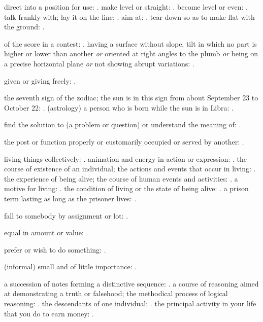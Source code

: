   direct into a position for use: . make level or straight: . become level or even: . talk frankly with; lay it on the line: . aim at: . tear down so as to make flat with the ground: .

  of the score in a contest: . having a surface without slope, tilt in which no part is higher or lower than another \textit{or} oriented at right angles to the plumb \textit{or} being on a precise horizontal plane \textit{or} not showing abrupt variations: .

  given or giving freely: .

  the seventh sign of the zodiac; the sun is in this sign from about September 23 to October 22: . (astrology) a person who is born while the sun is in Libra: .

  find the solution to (a problem or question) or understand the meaning of: .

  the post or function properly or customarily occupied or served by another: .

  living things collectively: . animation and energy in action or expression: . the course of existence of an individual; the actions and events that occur in living: . the experience of being alive; the course of human events and activities: . a motive for living: . the condition of living or the state of being alive: . a prison term lasting as long as the prisoner lives: .

  fall to somebody by assignment or lot: .

  equal in amount or value: .

  prefer or wish to do something: .

  (informal) small and of little importance: .

  a succession of notes forming a distinctive sequence: . a course of reasoning aimed at demonstrating a truth or falsehood; the methodical process of logical reasoning: . the descendants of one individual: . the principal activity in your life that you do to earn money: .

